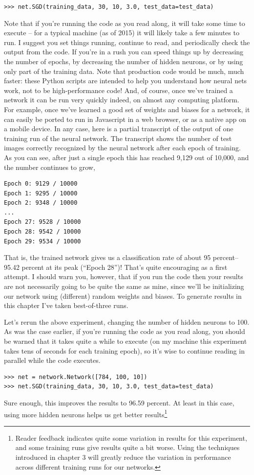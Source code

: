 \documentclass[a4paper,twoside,10pt]{book}
\begin{document}
\begin{lstlisting}
>>> net.SGD(training_data, 30, 10, 3.0, test_data=test_data)
\end{lstlisting}
Note that if you're running the code as you read along, it will take some time to execute -- for a typical machine (as of 2015) it will likely take a few minutes to run. I suggest you set things running, continue to read, and periodically check the output from the code. If you're in a rush you can speed things up by decreasing the number of epochs, by decreasing the number of hidden neurons, or by using only part of the training data. Note that production code would be much, much faster: these Python scripts are intended to help you understand how neural nets work, not to be high-performance code! And, of course, once we've trained a network it can be run very quickly indeed, on almost any computing platform. For example, once we've learned a good set of weights and biases for a network, it can easily be ported to run in Javascript in a web browser, or as a native app on a mobile device. In any case, here is a partial transcript of the output of one training run of the neural network. The transcript shows the number of test images correctly recognized by the neural network after each epoch of training. As you can see, after just a single epoch this has reached 9,129 out of 10,000, and the number continues to grow,
\begin{lstlisting}			
Epoch 0: 9129 / 10000
Epoch 1: 9295 / 10000
Epoch 2: 9348 / 10000
...
Epoch 27: 9528 / 10000
Epoch 28: 9542 / 10000
Epoch 29: 9534 / 10000
\end{lstlisting}
That is, the trained network gives us a classification rate of about 95 percent--95.42 percent at its peak (``Epoch 28'')! That's quite encouraging as a first attempt. I should warn you, however, that if you run the code then your results are not necessarily going to be quite the same as mine, since we'll be initializing our network using (different) random weights and biases. To generate results in this chapter I've taken best-of-three runs.

Let's rerun the above experiment, changing the number of hidden neurons to 100. As was the case earlier, if you're running the code as you read along, you should be warned that it takes quite a while to execute (on my machine this experiment takes tens of seconds for each training epoch), so it's wise to continue reading in parallel while the code executes.
\begin{lstlisting}
>>> net = network.Network([784, 100, 10])
>>> net.SGD(training_data, 30, 10, 3.0, test_data=test_data)
\end{lstlisting}
Sure enough, this improves the results to 96.59 percent. At least in this case, using more hidden neurons helps us get better results\footnote{Reader feedback indicates quite some variation in results for this experiment, and some training runs give results quite a bit worse. Using the techniques introduced in chapter 3 will greatly reduce the variation in performance across different training runs for our networks.}
\end{document}
